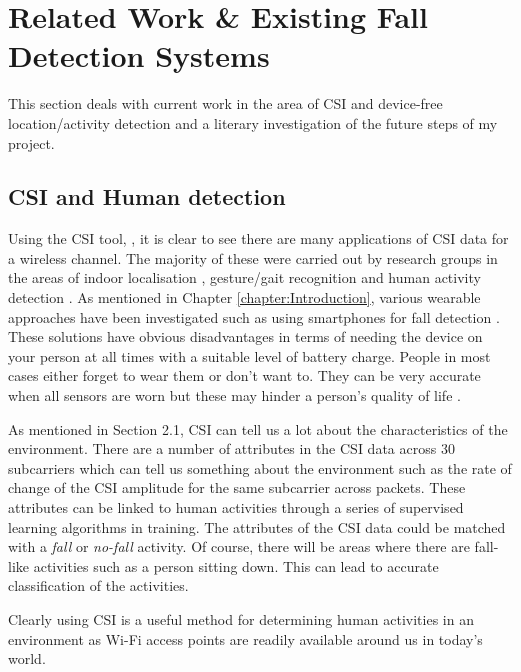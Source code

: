 \section{Related Work \& Existing Fall Detection Systems}
This section deals with current work in the area of CSI and device-free location/activity detection and a literary investigation of the future steps of my project. 
\subsection{CSI and Human detection}
Using the CSI tool, \cite{Halperin_csitool}, it is clear to see there are many applications of CSI data for a wireless channel. The majority of these were carried out by research groups in the areas of indoor localisation \citep{FilaIndoor}, gesture/gait recognition \citep{gestureCSI,GaitRecogCSI} and human activity detection \citep{eEyesActivity}. As mentioned in Chapter \ref{chapter:Introduction}, various wearable approaches have been investigated such as using smartphones for fall detection \citep{smartPhoneFall}. These solutions have obvious disadvantages in terms of needing the device on your person at all times with a suitable level of battery charge. People in most cases either forget to wear them or don't want to. They can be very accurate when all sensors are worn but these may hinder a person's quality of life \citep{ElderlyWearable}. \par
As mentioned in Section 2.1, CSI can tell us a lot about the characteristics of the environment. There are a number of attributes in the CSI data across 30 subcarriers which can tell us something about the environment such as the rate of change of the CSI amplitude for the same subcarrier across packets. These attributes can be linked to human activities through a series of supervised learning algorithms in training. The attributes of the CSI data could be matched with a \textit{fall} or \textit{no-fall} activity. Of course, there will be areas where there are fall-like activities such as a person sitting down. This can lead to accurate classification of the activities. 

Clearly using CSI is a useful method for determining human activities in an environment as Wi-Fi access points are readily available around us in today's world. 
